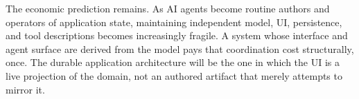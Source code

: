 \documentclass[sigplan,review,anonymous,10pt]{acmart}
\begin{document}
The economic prediction remains. As AI agents become routine authors and operators of application state, maintaining independent model, UI, persistence, and tool descriptions becomes increasingly fragile. A system whose interface and agent surface are derived from the model pays that coordination cost structurally, once. The durable application architecture will be the one in which the UI is a live projection of the domain, not an authored artifact that merely attempts to mirror it.



\end{document}

